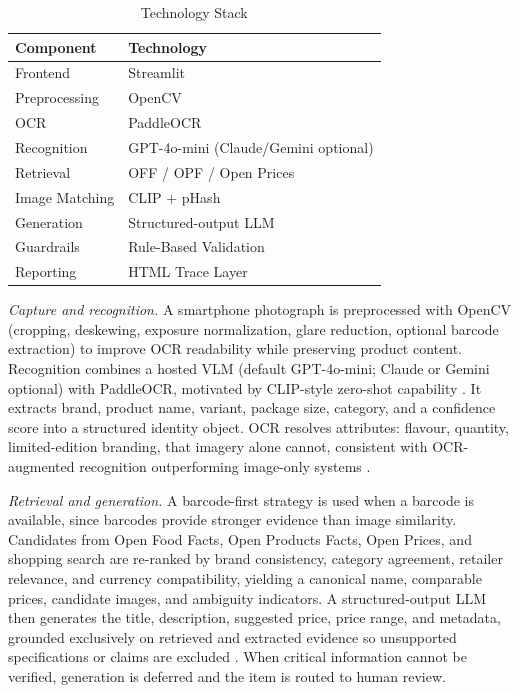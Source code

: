 \documentclass[conference]{IEEEtran}
\begin{document}
\begin{table}[t]
\caption{Technology Stack}
\label{tab:stack}
\centering
\begin{tabular}{ll}
\toprule
Component & Technology \\
\midrule
Frontend & Streamlit \\
Preprocessing & OpenCV \\
OCR & PaddleOCR \\
Recognition & GPT-4o-mini (Claude/Gemini optional) \\
Retrieval & OFF / OPF / Open Prices \\
Image Matching & CLIP + pHash \\
Generation & Structured-output LLM \\
Guardrails & Rule-Based Validation \\
Reporting & HTML Trace Layer \\
\bottomrule
\end{tabular}
\end{table}

\textit{Capture and recognition.} A smartphone photograph is preprocessed with
OpenCV (cropping, deskewing, exposure normalization, glare reduction, optional
barcode extraction) to improve OCR readability while preserving product content.
Recognition combines a hosted VLM (default GPT-4o-mini; Claude or Gemini
optional) with PaddleOCR, motivated by CLIP-style zero-shot capability
\cite{radford2021clip}. It extracts brand, product name, variant, package size,
category, and a confidence score into a structured identity object. OCR resolves
attributes: flavour, quantity, limited-edition branding, that imagery alone
cannot, consistent with OCR-augmented recognition outperforming image-only
systems \cite{ocrfusion2023}.

\textit{Retrieval and generation.} A barcode-first strategy is used when a
barcode is available, since barcodes provide stronger evidence than image
similarity. Candidates from Open Food Facts, Open Products Facts, Open Prices,
and shopping search are re-ranked by brand consistency, category agreement,
retailer relevance, and currency compatibility, yielding a canonical name,
comparable prices, candidate images, and ambiguity indicators. A
structured-output LLM then generates the title, description, suggested price,
price range, and metadata, grounded exclusively on retrieved and extracted
evidence so unsupported specifications or claims are excluded
\cite{li2024modict}. When critical information cannot be verified, generation is
deferred and the item is routed to human review.
\end{document}
